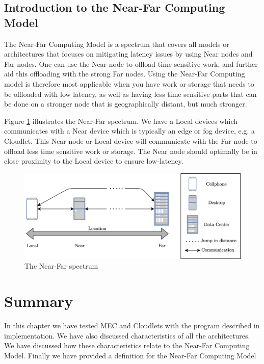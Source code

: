 \subsection{Introduction to the Near-Far Computing Model}
The Near-Far Computing Model is a spectrum that covers all models or architectures that focuses on mitigating latency issues by using Near nodes and Far nodes. One can use the Near node to offload time sensitive work, and further aid this offloading with the strong Far nodes. Using the Near-Far Computing model is therefore most applicable when you have work or storage that needs to be offloaded with low latency, as well as having less time sensitive parts that can be done on a stronger node that is geographically distant, but much stronger.

Figure \ref{fig:nearFarSimple} illustrates the Near-Far spectrum. We have a Local devices which communicates with a Near device which is typically an edge or fog device, e.g. a Cloudlet. This Near node or Local device will communicate with the Far node to offload less time sensitive work or storage. The Near node should optimally be in close proximity to the Local device to ensure low-latency.

\begin{figure}[t]
    \centering
    \includegraphics[scale=1]{chapters/evaluation/figures/near-far-diagram.png}
    \caption{The Near-Far spectrum}
    \label{fig:nearFarSimple}
\end{figure}



\section{Summary}
In this chapter we have tested MEC and Cloudlets with the program described in implementation. We have also discussed characteristics of all the architectures. We have discussed how these characteristics relate to the Near-Far Computing Model. Finally we have provided a definition for the Near-Far Computing Model





